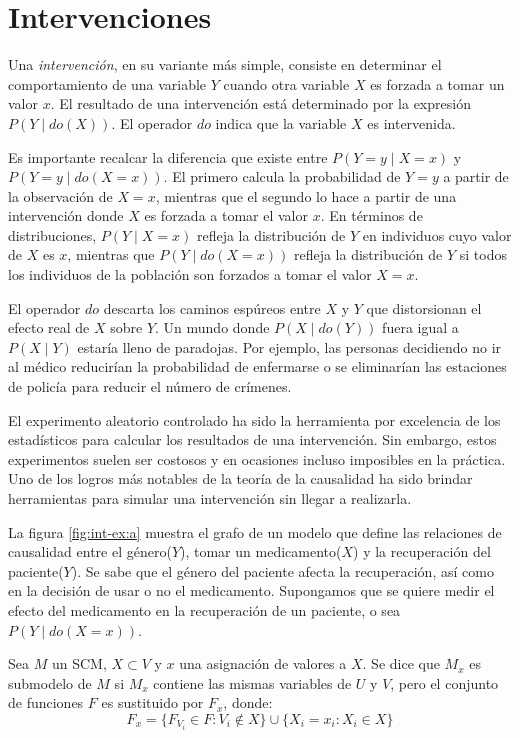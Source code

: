 \section{Intervenciones}
Una \textit{intervención}, en su variante más simple, consiste en determinar el comportamiento de una variable $Y$ cuando otra variable $X$ es forzada a tomar un valor $x$. El resultado de una intervención está determinado por la expresión $P(Y \mid do(X))$. El operador $do$ indica que la variable $X$ es intervenida.

Es importante recalcar la diferencia que existe entre $P(Y=y \mid X=x)$ y $P(Y=y \mid do(X=x))$. El primero calcula la probabilidad de $Y=y$ a partir de la observación de $X=x$, mientras que el segundo lo hace a partir de una intervención donde $X$ es forzada a tomar el valor $x$. En términos de distribuciones, $P(Y \mid X=x)$ refleja la distribución de $Y$ en individuos cuyo valor de $X$ es $x$, mientras que $P(Y \mid do(X=x))$ refleja la distribución de $Y$ si todos los individuos de la población son forzados a tomar el valor $X=x$.

El operador $do$ descarta los caminos espúreos entre $X$ y $Y$ que distorsionan el efecto real de $X$ sobre $Y$. Un mundo donde $P(X \mid do(Y))$ fuera igual a $P(X \mid Y)$ estaría lleno de paradojas. Por ejemplo, las personas decidiendo no ir al médico reducirían la probabilidad de enfermarse o se eliminarían las estaciones de policía para reducir el número de crímenes.

El experimento aleatorio controlado ha sido la herramienta por excelencia de los estadísticos para calcular los resultados de una intervención. Sin embargo, estos experimentos suelen ser costosos y en ocasiones incluso imposibles en la práctica. Uno de los logros más notables de la teoría de la causalidad ha sido brindar herramientas para simular una intervención sin llegar a realizarla.

La figura \ref{fig:int-ex:a} muestra el grafo de un modelo que define las relaciones de causalidad entre el género($Y$), tomar un medicamento($X$) y la recuperación del paciente($Y$). Se sabe que el género del paciente afecta la recuperación, así como en la decisión de usar o no el medicamento. Supongamos que se quiere medir el efecto del medicamento en la recuperación de un paciente, o sea $P(Y \mid do(X=x))$.

\begin{dfn}[Submodelo]
	Sea $M$ un SCM, $X \subset V$ y $x$ una asignación de valores a $X$. Se dice que $M_x$ es submodelo de $M$ si $M_x$ contiene las mismas variables de $U$ y $V$, pero el conjunto de funciones $F$ es sustituido por $F_x$, donde:
	\[ F_x = \{ F_{V_i} \in F: V_i \notin X \} \cup \{X_i=x_i: X_i \in X \} \]  
\end{dfn}

